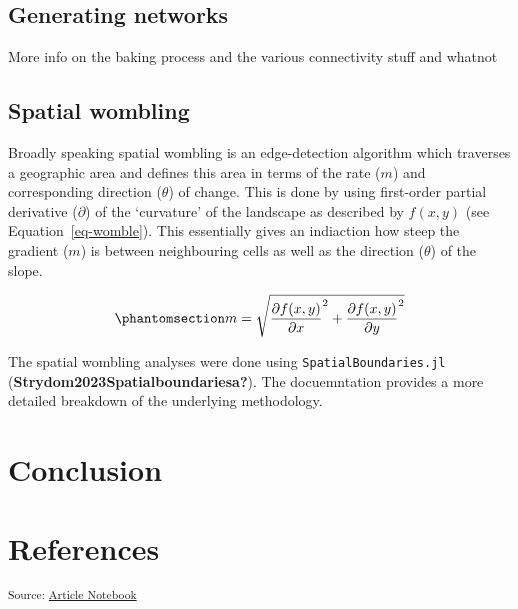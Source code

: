 \documentclass[
]{agujournal2019}
\begin{document}
\subsection{Generating networks}\label{generating-networks}

More info on the baking process and the various connectivity stuff and
whatnot

\subsection{Spatial wombling}\label{spatial-wombling}

Broadly speaking spatial wombling is an edge-detection algorithm which
traverses a geographic area and defines this area in terms of the rate
(\(m\)) and corresponding direction (\(\theta\)) of change. This is done
by using first-order partial derivative (\(\partial\)) of the
`curvature' of the landscape as described by \(f(x,y)\) (see
Equation~\ref{eq-womble}). This essentially gives an indiaction how
steep the gradient (\(m\)) is between neighbouring cells as well as the
direction (\(\theta\)) of the slope.

\begin{equation}\phantomsection\label{eq-womble}{
m = \sqrt{\frac{\partial f(x,y)}{\partial x}^2 + \frac{\partial f(x,y)}{\partial y}^2}
}\end{equation}

The spatial wombling analyses were done using
\texttt{SpatialBoundaries.jl} (\textbf{Strydom2023Spatialboundariesa?}).
The docuemntation provides a more detailed breakdown of the underlying
methodology.

\section{Conclusion}\label{conclusion}

\section*{References}\label{references}

\vspace{1em}

\textsubscript{Source:
\href{https://PoisotLab.github.io/ms_womble_ya_net/index.qmd.html}{Article
Notebook}}
\end{document}
